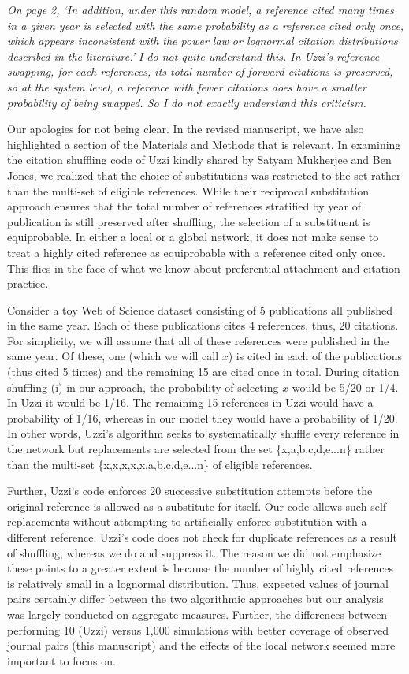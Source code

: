 \documentclass[11pt, oneside]{article}   	%
\begin{document}
 
\emph{On page 2, `In addition, under this random model, a reference cited many times in a given year is selected with the same probability as a reference cited only once, which appears inconsistent with the power law or lognormal citation distributions described in the literature.'  I do not quite understand this.  In Uzzi's reference swapping, for each references, its total number of forward citations is preserved, so at the system level, a reference with fewer citations does have a smaller probability of being swapped.  So I do not exactly understand this criticism.}

Our apologies for not being clear. In the  revised manuscript, we have also highlighted a section of the Materials and Methods that is relevant. In examining the citation shuffling code of Uzzi kindly shared by Satyam Mukherjee and Ben Jones, we realized that the choice of substitutions was restricted to the set rather than the multi-set of eligible references. While their reciprocal substitution approach  ensures that the total number of references stratified by year of publication is still preserved after shuffling, the selection of a substituent is equiprobable. In either a local or a global network, it does not make sense to treat a highly cited reference as equiprobable with a reference cited only once. This flies in the face of what we know about preferential attachment and citation practice. 

Consider a toy Web of Science dataset consisting of 5 publications all published in the same year. Each of these publications cites 4 references, thus, 20 citations. For simplicity, we will assume that all of these references were published in the same year. Of these, one (which we will call $x$) is cited in each of the publications (thus cited 5 times) and the remaining 15 are cited once in total. During citation shuffling (i)  in our approach, the probability of selecting $x$ would be 5/20 or 1/4. In Uzzi it would be 1/16. The remaining 15 references in Uzzi would have a probability of 1/16, whereas in our model they would have a probability of 1/20. In other words, Uzzi's algorithm seeks to systematically shuffle every reference in the network but replacements are selected from the set \{x,a,b,c,d,e...n\} rather than the multi-set \{x,x,x,x,x,a,b,c,d,e...n\} of eligible references. 

Further, Uzzi's code enforces 20 successive substitution attempts before the original reference is allowed as a substitute for itself. Our code allows such self replacements without attempting to artificially enforce substitution with a different reference. Uzzi's code does not check for duplicate references as a result of shuffling, whereas we do and suppress it. The reason we did not emphasize these points to a greater extent is because the number of highly cited references is relatively small in a lognormal distribution. Thus, expected values of journal pairs certainly differ between the two algorithmic approaches but our analysis was largely conducted on aggregate measures. Further, the differences between performing 10 (Uzzi) versus 1,000 simulations with better coverage of observed journal pairs (this manuscript) and the effects of the local network seemed more important to focus on. 
\end{document}
